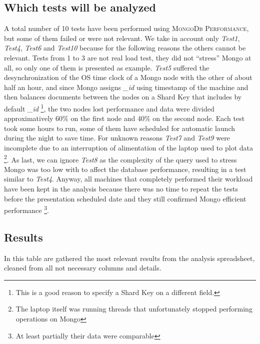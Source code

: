 \subsection{Which tests will be analyzed}
A total number of 10 tests have been performed using \textsc{MongoDb Performance}, but some of them failed or were not relevant.
We take in account only \textit{Test1}, \textit{Test4}, \textit{Test6} and \textit{Test10} because for the following reasons the others cannot be relevant.
Tests from 1 to 3 are not real load test, they did not “stress” Mongo at all, so only one of them is presented as example.
\textit{Test5} suffered the desynchronization of the OS time clock of a Mongo node with the other of about half an hour, and since Mongo assigns \textit{\_id} using timestamp of the machine and then balances documents between the nodes on a Shard Key that includes by default \textit{\_id} \footnote{This is a good reason to specify a Shard Key on a different field.}, the two nodes lost performance and data were divided approximatively 60\% on the first node and 40\% on the second node. 
Each test  took some hours to run, some of them have scheduled for automatic launch during the night to save time.
For unknown reasons \textit{Test7} and  \textit{Test9} were incomplete due to an interruption of alimentation of the laptop used to plot data \footnote{The laptop itself was running threads that unfortunately stopped performing operations on Mongo}.
As last, we can ignore \textit{Test8} as the complexity of the query used to stress Mongo was too low with to affect the database performance, resulting in a test similar to \textit{Test4}.
Anyway, all machines that completely performed their workload have been kept in the analysis because there was no time to repeat the tests before the presentation scheduled date and they still confirmed Mongo efficient performance \footnote{At least partially their data were comparable}.

\subsection{Results}
In this table are gathered the most relevant results from the analysis spreadsheet, cleaned from all not necessary columns and details.


